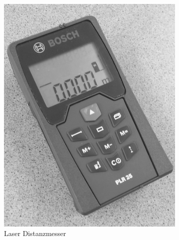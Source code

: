\begin{figure}[ht!]
         \centering
         \caption[Kalibrierwerkzeuge]{Werkzeuge, die bei der Kalibrierung verwendet werden.}
         \begin{subfigure}[t]{0.4\textwidth}
                 \centering
                 \includegraphics[width=\textwidth]{img/Lasermeter.png}
                 \caption{Laser Distanzmesser}
                 \label{fig:laser_meter}
         \end{subfigure}
%
\qquad         
%
         \begin{subfigure}[t]{0.4\textwidth}
                 \centering

\end{subfigure}
\end{figure}
